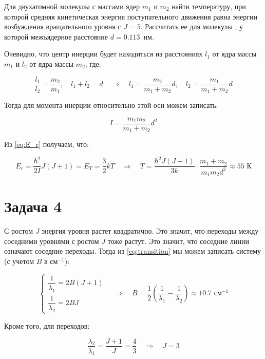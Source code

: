 \documentclass[a4paper, 12pt]{article}
\newcommand{\qrq}
{\ensuremath{\quad \Rightarrow \quad}} %
\begin{document}
Для двухатомной молекулы с массами ядер $m_1$ и $m_2$ найти температуру, при которой средняя кинетическая энергия поступательного движения равна энергии возбуждения вращательного уровня с $J = 5$. Рассчитать ее для молекулы , у которой межъядерное расстояние $d= 0.113$~нм.

Очевидно, что центр инерции будет находиться на расстояниях $l_1$ от ядра массы $m_1$ и $l_2$ от ядра массы $m_2$, где:

\begin{equation}
	\frac{l_1}{l_2} = \frac{m_2}{m_1}, \quad l_1 + l_2 = d \qrq l_1 = \frac{m_2}{m_1 + m_2}d, \quad l_2 = \frac{m_1}{m_1 + m_2} d
\end{equation}

Тогда для момента инерции относительно этой оси можем записать:

\begin{equation}
	I = \frac{m_1 m_2}{m_1 + m_2} d^2
\end{equation}

Из \ref{eq:E_r} получаем, что:

\begin{equation}
	E_r = \frac{\hbar^2}{2I} J(J+1) = E_T = \frac{3}{2}kT \qrq T = \frac{\hbar^2 J(J+1)}{3k} \cdot \frac{m_1 + m_2}{m_1 m_2 d^2} \approx 55 \text{ К}
\end{equation}

\section*{Задача 4}

С ростом $J$ энергия уровня растет квадратично. Это значит, что переходы между соседними уровнями с ростом $J$ тоже растут. Это значит, что соседние линии означают соседние переходы. Тогда из \ref{eq:transition} мы можем записать систему (с учетом $B$ в см$^{-1}$):

\begin{equation}
	\begin{cases*}
		\dfrac{1}{\lambda_1} = 2 B (J + 1)\\
		\dfrac{1}{\lambda_2} = 2 B J
	\end{cases*} \qrq  B = \frac{1}{2}\left(\frac{1}{\lambda_1} - \frac{1}{\lambda_2}\right) \approx 10.7 \text{ см$^{-1}$} %
\end{equation}

Кроме того, для переходов:

\begin{equation}
	\frac{\lambda_2}{\lambda_1} = \frac{J + 1}{J} = \frac{4}{3} \qrq J = 3
\end{equation}
\end{document}
